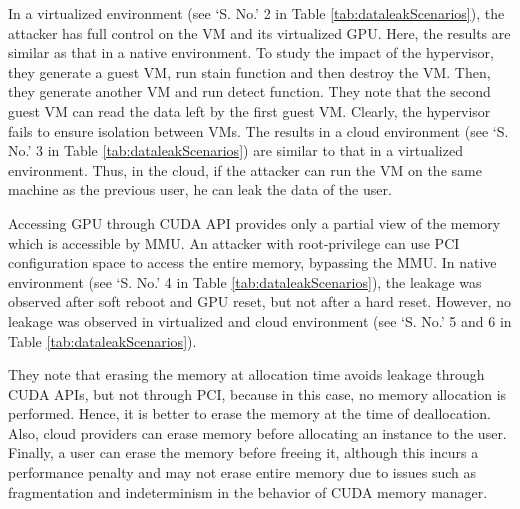  

In a virtualized environment (see `S. No.' 2 in Table \ref{tab:dataleakScenarios}), the attacker has full control on the VM and its virtualized GPU. Here, the results are similar as that in a native environment. To study the impact of the hypervisor, they generate a guest VM, run stain function and then destroy the VM. Then, they generate another VM and run detect function. They note that the second guest VM can read the data left by the first guest VM. Clearly, the hypervisor fails to ensure isolation between VMs. The results in a cloud environment (see `S. No.' 3 in Table \ref{tab:dataleakScenarios}) are similar to that in a virtualized environment. Thus, in the cloud, if the attacker can run the VM on the same machine as the previous user, he can leak the data of the user.

Accessing GPU through CUDA API provides only a partial view of the memory which is accessible by MMU. An attacker with root-privilege can use PCI configuration space to access the entire memory, bypassing the MMU. In native environment (see `S. No.' 4 in Table \ref{tab:dataleakScenarios}), the leakage was observed after soft reboot and GPU reset, but not after a hard reset. However, no leakage was observed in virtualized and cloud environment (see `S. No.' 5 and 6 in Table \ref{tab:dataleakScenarios}). 

They note that erasing the memory at allocation time avoids leakage through CUDA APIs, but not through PCI, because in this case, no memory allocation is performed. Hence, it is better to erase the memory at the time of deallocation. Also, cloud providers can erase memory before allocating an instance to the user. Finally, a user can erase the memory before freeing it, although this incurs a performance penalty and may not erase entire memory due to issues such as fragmentation and indeterminism in the behavior of CUDA memory manager.
 
  


 

